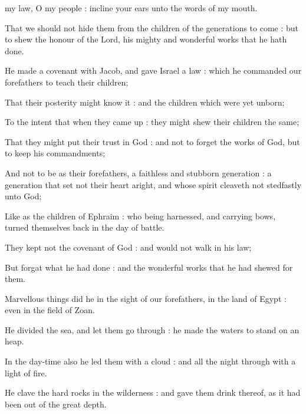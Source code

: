 

 my law, O my people : incline your ears unto the words of my mouth.\par
{}
That we should not hide them from the children of the generations to come : but to shew the honour of the Lord, his mighty and wonderful works that he hath done.\par
{}He made a covenant with Jacob, and gave Israel a law : which he commanded our forefathers to teach their children;\par
{}That their posterity might know it : and the children which were yet unborn;\par
{}To the intent that when they came up : they might shew their children the same;\par
{}That they might put their trust in God : and not to forget the works of God, but to keep his commandments;\par
{}And not to be as their forefathers, a faithless and stubborn generation : a generation that set not their heart aright, and whose spirit cleaveth not stedfastly unto God;\par
{}Like as the children of Ephraim : who being harnessed, and carrying bows, turned themselves back in the day of battle.\par
{}They kept not the covenant of God : and would not walk in his law;\par
{}But forgat what he had done : and the wonderful works that he had shewed for them.\par
{}Marvellous things did he in the sight of our forefathers, in the land of Egypt : even in the field of Zoan.\par
{}He divided the sea, and let them go through : he made the waters to stand on an heap.\par
{}In the day-time also he led them with a cloud : and all the night through with a light of fire.\par
{}He clave the hard rocks in the wilderness : and gave them drink thereof, as it had been out of the great depth.\par
